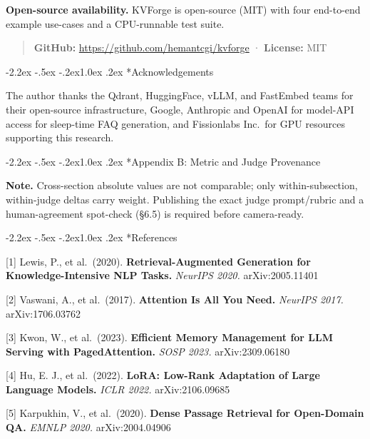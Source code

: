 \documentclass[10pt,twocolumn]{article}
\makeatletter
\renewcommand\section{\@startsection{section}{1}{\z@}%
  {-2.2ex \@plus -.5ex \@minus -.2ex}{1.0ex \@plus .2ex}%
  {\normalfont\large\bfseries}}
\makeatother
\begin{document}
\textbf{Open-source availability.} KVForge is open-source (MIT) with four end-to-end example use-cases and a CPU-runnable test suite.

\begin{quote}
\textbf{GitHub:} \url{https://github.com/hemantcgi/kvforge} · \textbf{License:} MIT
\end{quote}

\hypertarget{acknowledgements}{%
\section*{Acknowledgements}\label{acknowledgements}}

The author thanks the Qdrant, HuggingFace, vLLM, and FastEmbed teams for their open-source infrastructure, Google, Anthropic and OpenAI for model-API access for sleep-time FAQ generation, and Fissionlabs Inc.~for GPU resources supporting this research.

\hypertarget{appendix-b-metric-and-judge-provenance}{%
\section*{Appendix B: Metric and Judge Provenance}\label{appendix-b-metric-and-judge-provenance}}

\textbf{Note.} Cross-section absolute values are not comparable; only within-subsection, within-judge deltas carry weight. Publishing the exact judge prompt/rubric and a human-agreement spot-check (§6.5) is required before camera-ready.

\hypertarget{references}{%
\section*{References}
\small\label{references}}

{[}1{]} Lewis, P., et al.~(2020). \textbf{Retrieval-Augmented Generation for Knowledge-Intensive NLP Tasks.} \emph{NeurIPS 2020.} arXiv:2005.11401

{[}2{]} Vaswani, A., et al.~(2017). \textbf{Attention Is All You Need.} \emph{NeurIPS 2017.} arXiv:1706.03762

{[}3{]} Kwon, W., et al.~(2023). \textbf{Efficient Memory Management for LLM Serving with PagedAttention.} \emph{SOSP 2023.} arXiv:2309.06180

{[}4{]} Hu, E. J., et al.~(2022). \textbf{LoRA: Low-Rank Adaptation of Large Language Models.} \emph{ICLR 2022.} arXiv:2106.09685

{[}5{]} Karpukhin, V., et al.~(2020). \textbf{Dense Passage Retrieval for Open-Domain QA.} \emph{EMNLP 2020.} arXiv:2004.04906
\end{document}
